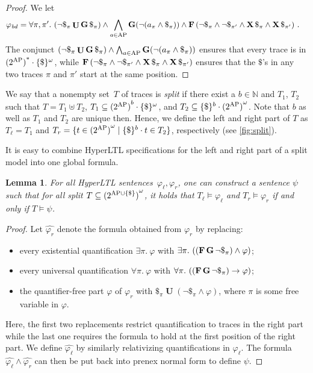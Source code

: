 \documentclass[dvipsnames,10pt,a4paper]{amsart}
\newtheorem{lem}[thm]{Lemma}
\theoremstyle{definition}
\theoremstyle{remark}
\newcommand{\nats}{\mathbb{N}}
\newcommand\Nat{\nats}
\newcommand{\F}{\mathop{\mathbf{F}\vphantom{a}}\nolimits}
\newcommand{\G}{\mathop{\mathbf{G}\vphantom{a}}\nolimits}
\DeclareMathOperator{\U}{\mathbf{U}}
\newcommand{\X}{\mathop{\mathbf{X}\vphantom{a}}\nolimits}
\newcommand{\hyltl}{{HyperLTL}\xspace}
\newcommand\AP{\textup{AP}}
\newcommand\Tl{T_\ell}
\newcommand\Tr {T_r}
\newcommand\phib{\varphi_{\mathit{bd}}}
\begin{document}
\begin{proof}
  We let
    \begin{align*}
    \phib =
    \forall \pi, \pi'.\
    & (\lnot \$_\pi \U \G \$_\pi) \land
      \bigwedge_{a \in \AP} \G(\lnot (a_\pi \land \$_\pi)) \land
      \F \left(
      \lnot \$_\pi \land \lnot \$_{\pi'} \land \X \$_\pi \land \X \$_{\pi'}
      \right) \, .
    \end{align*}
    The conjunct $(\lnot \$_\pi \U \G \$_\pi) \land
    \bigwedge_{a \in \AP} \G(\lnot (a_\pi \land \$_\pi))$
    ensures that every trace is in ${(2^{\AP})}^\ast \cdot \{\$\}^\omega$,
    while
    $\F \left(
      \lnot \$_\pi \land \lnot \$_{\pi'} \land \X \$_\pi \land \X \$_{\pi'}
    \right)$
    ensures that the $\$$'s in any two traces $\pi$ and $\pi'$ start at the same
    position.
\end{proof}

We say that a nonempty set~$T$ of traces is \emph{split} if there exist a $b \in \Nat$ and $T_1$, $T_2$
such that $T = T_1 \uplus T_2$,
$T_1 \subseteq {(2^{\AP})}^b \cdot \{\$\}^\omega$, and
$T_2 \subseteq \{\$\}^b \cdot {(2^{\AP})}^\omega$.
Note that $b$ as well as $T_1$ and $T_2$ are unique then.
Hence, we define the left and right part of $T$ as $\Tl = T_1$ and
$\Tr  = \{t \in {(2^{\AP})}^\omega \mid \{\$\}^b \cdot t \in T_2\}$, respectively
(see \autoref{fig:split}).


It is easy to combine \hyltl specifications for the left and right part
of a split model into one global formula.

\begin{lem}
    \label{lem:dupsi}
  For all \hyltl sentences~$\varphi_\ell, \varphi_r$, one can construct
  a sentence $\psi$ such that for all split 
  $T \subseteq {(2^{\AP\cup \{\$\}})}^\omega$,
  it holds that   $\Tl \models \varphi_\ell$ and $\Tr  \models \varphi_r$ if and only if $T \models \psi$.
\end{lem}

\begin{proof}
  Let $\widehat {\varphi_r}$ denote the formula obtained from $\varphi_r$
  by replacing:
  \begin{itemize}
  \item every existential quantification $\exists \pi.\ \varphi$ with
    $\exists \pi.\ ((\F\G \lnot \$_\pi) \land \varphi)$;
  \item every universal quantification $\forall \pi.\ \varphi$ with
    $\forall \pi.\ ((\F\G \lnot \$_\pi) \rightarrow \varphi)$;
  \item the quantifier-free part $\varphi$ of $\varphi_r$ with
    $\$_\pi \U (\lnot \$_\pi \land \varphi)$,
    where $\pi$ is some free variable in $\varphi$.
  \end{itemize}
 Here, the first two replacements restrict quantification to traces in the right part while the last one requires the formula to hold at the first position of the right part. 
  We define $\widehat {\varphi_\ell}$ by similarly relativizing quantifications
  in $\varphi_\ell$.
  The formula $\widehat {\varphi_\ell} \land \widehat {\varphi_r}$ can then
  be put back into prenex normal form to define $\psi$.
\end{proof}
\end{document}
